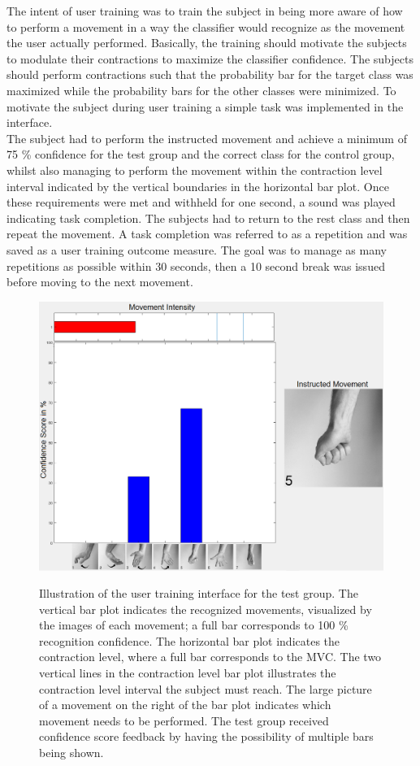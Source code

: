 The intent of user training was to train the subject in being more aware of how to perform a movement in a way the classifier would recognize as the movement the user actually performed. Basically, the training should motivate the subjects to modulate their contractions to maximize the classifier confidence. The subjects should perform contractions such that the probability bar for the target class was maximized while the probability bars for the other classes were minimized. To motivate the subject during user training a simple task was implemented in the interface. \\
The subject had to perform the instructed movement and achieve a minimum of 75 \% confidence for the test group and the correct class for the control group, whilst also managing to perform the movement within the contraction level interval indicated by the vertical boundaries in the horizontal bar plot. Once these requirements were met and withheld for one second, a sound was played indicating task completion. The subjects had to return to the rest class and then repeat the movement. A task completion was referred to as a repetition and was saved as a user training outcome measure. The goal was to manage as many repetitions as possible within 30 seconds, then a 10 second break was issued before moving to the next movement. \\
\begin{figure}[H]
	\includegraphics[width=.47\textwidth]{figures/xBackground/usertraintestGUI} \\
	\caption{Illustration of the user training interface for the test group. The vertical bar plot indicates the recognized movements, visualized by the images of each movement; a full bar corresponds to 100 \% recognition confidence. The horizontal bar plot indicates the contraction level, where a full bar corresponds to the MVC. The two vertical lines in the contraction level bar plot illustrates the contraction level interval the subject must reach. The large picture of a movement on the right of the bar plot indicates which movement needs to be performed. The test group received confidence score feedback by having the possibility of multiple bars being shown.}
	\label{fig:test}
\end{figure}    
